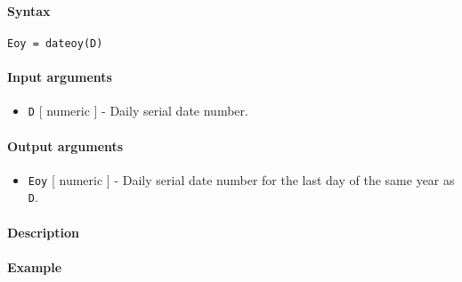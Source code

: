 


	\paragraph{Syntax}

\begin{verbatim}
Eoy = dateoy(D)
\end{verbatim}

\paragraph{Input arguments}

\begin{itemize}
\itemsep1pt\parskip0pt
\item
  \texttt{D} {[} numeric {]} - Daily serial date number.
\end{itemize}

\paragraph{Output arguments}

\begin{itemize}
\itemsep1pt\parskip0pt
\item
  \texttt{Eoy} {[} numeric {]} - Daily serial date number for the last
  day of the same year as \texttt{D}.
\end{itemize}

\paragraph{Description}

\paragraph{Example}


